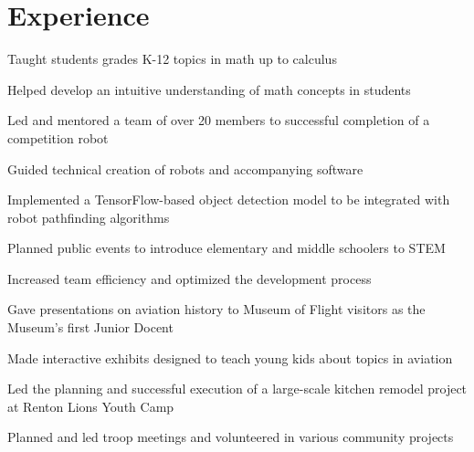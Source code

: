 \documentclass[]{deedy-resume}
\begin{document}
\begin{minipage}[t]{0.66\textwidth} 


\section{Experience}
\vspace{\topsep} %
\begin{tightemize}
\item Taught students grades K-12 topics in math up to calculus
\item Helped develop an intuitive understanding of math concepts in students
\end{tightemize}
\sectionsep

\begin{tightemize}
\item Led and mentored a team of over 20 members to successful completion of a competition robot
\item Guided technical creation of robots and accompanying software
\item Implemented a TensorFlow-based object detection model to be integrated with robot pathfinding algorithms
\item Planned public events to introduce elementary and middle schoolers to STEM
\item Increased team efficiency and optimized the development process
\end{tightemize}
\sectionsep

\begin{tightemize}
\item Gave presentations on aviation history to Museum of Flight visitors as the Museum's first Junior Docent
\item Made interactive exhibits designed to teach young kids about topics in aviation
\end{tightemize}
\sectionsep

\begin{tightemize}
\item Led the planning and successful execution of a large-scale kitchen remodel project at Renton Lions Youth Camp
\item Planned and led troop meetings and volunteered in various community projects
\end{tightemize}
\sectionsep


\end{minipage}
\end{document}
